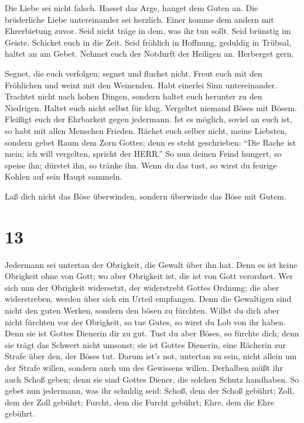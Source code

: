  Die Liebe sei nicht falsch. Hasset das Arge, hanget dem
Guten an.  Die brüderliche Liebe untereinander sei
herzlich. Einer komme dem andern mit Ehrerbietung zuvor. 
Seid nicht träge in dem, was ihr tun sollt. Seid brünstig im Geiste.
Schicket euch in die Zeit.  Seid fröhlich in Hoffnung,
geduldig in Trübsal, haltet an am Gebet.  Nehmet euch der
Notdurft der Heiligen an. Herberget gern.

 Segnet, die euch verfolgen; segnet und fluchet nicht.
 Freut euch mit den Fröhlichen und weint mit den Weinenden.
 Habt einerlei Sinn untereinander. Trachtet nicht nach
hohen Dingen, sondern haltet euch herunter zu den Niedrigen.
 Haltet euch nicht selbst für klug. Vergeltet niemand Böses
mit Bösem. Fleißigt euch der Ehrbarkeit gegen jedermann. 
Ist es möglich, soviel an euch ist, so habt mit allen Menschen Frieden.
 Rächet euch selber nicht, meine Liebsten, sondern gebet
Raum dem Zorn Gottes; denn es steht geschrieben: ``Die Rache ist mein;
ich will vergelten, spricht der HERR.''  So nun deinen
Feind hungert, so speise ihn; dürstet ihn, so tränke ihn. Wenn du das
tust, so wirst du feurige Kohlen auf sein Haupt sammeln.

 Laß dich nicht das Böse überwinden, sondern überwinde das
Böse mit Gutem.

\hypertarget{section-12}{%
\section{13}\label{section-12}}

 Jedermann sei untertan der Obrigkeit, die Gewalt über ihn
hat. Denn es ist keine Obrigkeit ohne von Gott; wo aber Obrigkeit ist,
die ist von Gott verordnet.  Wer sich nun der Obrigkeit
widersetzt, der widerstrebt Gottes Ordnung; die aber widerstreben,
werden über sich ein Urteil empfangen.  Denn die Gewaltigen
sind nicht den guten Werken, sondern den bösen zu fürchten. Willst du
dich aber nicht fürchten vor der Obrigkeit, so tue Gutes, so wirst du
Lob von ihr haben.  Denn sie ist Gottes Dienerin dir zu gut.
Tust du aber Böses, so fürchte dich; denn sie trägt das Schwert nicht
umsonst; sie ist Gottes Dienerin, eine Rächerin zur Strafe über den, der
Böses tut.  Darum ist's not, untertan zu sein, nicht allein
um der Strafe willen, sondern auch um des Gewissens willen. 
Derhalben müßt ihr auch Schoß geben; denn sie sind Gottes Diener, die
solchen Schutz handhaben.  So gebet nun jedermann, was ihr
schuldig seid: Schoß, dem der Schoß gebührt; Zoll, dem der Zoll gebührt;
Furcht, dem die Furcht gebührt; Ehre, dem die Ehre gebührt.


